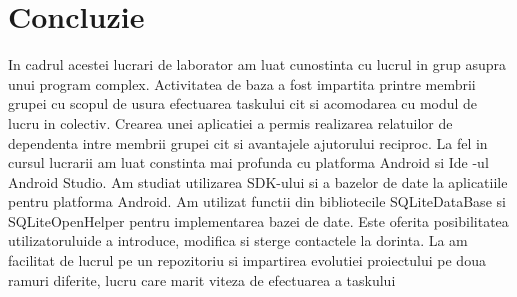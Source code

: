 \section*{Concluzie}
 	
	In cadrul acestei lucrari de laborator am luat cunostinta cu lucrul in grup asupra unui program complex. Activitatea de baza a fost impartita printre membrii grupei cu scopul de usura efectuarea taskului cit si acomodarea cu modul de lucru in colectiv. Crearea unei aplicatiei a permis realizarea relatuilor de dependenta intre membrii grupei cit si avantajele ajutorului reciproc. La fel in cursul lucrarii am luat constinta mai profunda cu platforma Android si Ide -ul Android Studio.  Am studiat utilizarea SDK-ului si a bazelor de date la aplicatiile pentru platforma Android. Am utilizat functii din bibliotecile SQLiteDataBase si SQLiteOpenHelper
pentru implementarea bazei de date. Este oferita posibilitatea utilizatoruluide a introduce, modifica si sterge contactele la dorinta. La am facilitat de lucrul pe un repozitoriu si impartirea evolutiei proiectului pe doua ramuri diferite, lucru care marit viteza de efectuarea a taskului


\clearpage